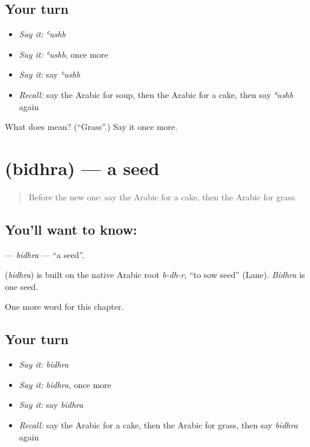 \subsection*{Your turn}
\begin{itemize}
\raggedright
  \item \emph{Say it:} \emph{ʿushb}
  \item \emph{Say it:} \emph{ʿushb}, once more
  \item \emph{Say it:} say \emph{ʿushb}
  \item \emph{Recall:} say the Arabic for soup, then the Arabic for a cake, then say \emph{ʿushb} again
\end{itemize}

\begin{tcolorbox}[breakable,colback=teal!4,colframe=teal!35!black,title={Before you move on}]
What does  mean? (\textquotedblleft{}Grass\textquotedblright{}.) Say it once more.
\end{tcolorbox}
\section[\texorpdfstring{\ar{بذرة} (bidhra)}{بذرة (bidhra)}]{ (bidhra) — a seed}

\label{lesson:AR-C131-bidhra}



\begin{quote}
Before the new one: say the Arabic for a cake, then the Arabic for grass.
\end{quote}

\subsection*{You'll want to know: }
\textbf{} — \emph{bidhra} — \textquotedblleft{}a seed\textquotedblright{}.

\begin{cousinweb}
\textbf{} (\emph{bidhra}) is built on the native Arabic root \emph{b-dh-r}, \textquotedblleft{}to sow seed\textquotedblright{} (Lane). \emph{Bidhra} is one seed.
\end{cousinweb}

\begin{grammarlens}[title={What you've built}]
One more word for this chapter.
\end{grammarlens}

\subsection*{Your turn}
\begin{itemize}
\raggedright
  \item \emph{Say it:} \emph{bidhra}
  \item \emph{Say it:} \emph{bidhra}, once more
  \item \emph{Say it:} say \emph{bidhra}
  \item \emph{Recall:} say the Arabic for a cake, then the Arabic for grass, then say \emph{bidhra} again
\end{itemize}

